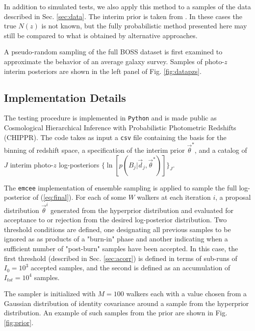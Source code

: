 \documentclass[preprint]{aastex}
\begin{document}
In addition to simulated tests, we also apply this method to a samples of the 
data described in Sec. \ref{sec:data}.  The interim prior is taken from 
\citet{Sheldon2012}.  In these cases the true $N(z)$ is not known, but the 
fully probabilistic method presented here may still be compared to what is 
obtained by alternative approaches.

A pseudo-random sampling of the full BOSS dataset is first examined to 
approximate the behavior of an average galaxy survey.  Samples of photo-$z$ 
interim posteriors are shown in the left panel of Fig. \ref{fig:datapzs}.  

\subsection{Implementation Details}
\label{sec:mcmc}

The testing procedure is implemented in \texttt{Python} and is made public as 
Cosmological Hierarchical Inference with Probabilistic Photometric Redshifts 
(CHIPPR).  The code takes as input a \texttt{csv} file containing the basis for 
the binning of redshift space, a specification of the interim prior 
$\vec{\theta}^{*}$, and a catalog of $J$ interim photo-$z$ log-posteriors 
$\{\ln[p(B_{j}|\vec{d}_{j},\vec{\theta}^{*})]\}_{J}$.

The \texttt{emcee} \citep{Foreman-Mackey2013} implementation of ensemble 
sampling is applied to sample the full log-posterior of (\ref{eq:final}).   For 
each of some $W$ walkers at each iteration $i$, a proposal distribution 
$\vec{\theta}^{i}$ generated from the hyperprior distribution and evaluated for 
acceptance to or rejection from the desired log-posterior distribution.  Two 
threshold conditions are defined, one designating all previous samples to be 
ignored as as products of a "burn-in" phase and another indicating when a 
sufficient number of "post-burn" samples have been accepted.  In this case, the 
first threshold (described in Sec. \ref{sec:acorr}) is defined in terms of 
sub-runs of $I_{0}=10^{3}$ accepted samples, and the second is defined as an 
accumulation of $I_{tot}=10^{4}$ samples.

The sampler is initialized with $M=100$ walkers each with a value chosen from a 
Gaussian distribution of identity covariance around a sample from the 
hyperprior distribution.  An example of such samples from the prior are shown 
in Fig. \ref{fig:prior}.
\end{document}
